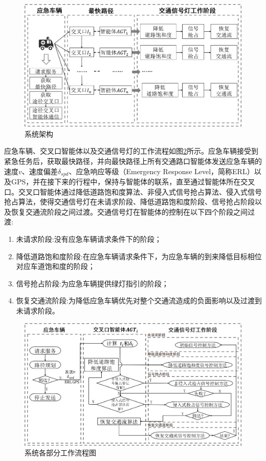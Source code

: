 \begin{figure}[ht]
	\centering
	\includegraphics[width=\textwidth]{figures/architecture.png}
	\caption{系统架构}
	\label{fig:architecture}
\end{figure}

应急车辆、交叉口智能体以及交通信号灯的工作流程如图\ref{fig:kuangjia}所示。应急车辆接受到紧急任务后，获取最快路径，并向最快路径上所有交通路口智能体发送应急车辆的速度${v}$、速度偏差${\delta_{spd}}$、应急响应等级（Emergency Response Level，简称ERL）以及GPS，并在接下来的行程中，保持与智能体的联系，直至通过智能体所在交叉口。交叉口智能体通过降低道路饱和度算法、非侵入式信号抢占算法、侵入式信号抢占算法，使得交通信号灯在未请求阶段、降低道路饱和度阶段、信号抢占阶段以及恢复交通流阶段之间过渡。交通信号灯在智能体的控制在以下四个阶段之间过渡:

\begin{enumerate}
	\item 未请求阶段:没有应急车辆请求条件下的阶段；
	\item 降低道路饱和度阶段:在应急车辆请求条件下，为应急车辆的到来降低目标相位对应车道饱和度的阶段；
	\item 信号抢占阶段:为应急车辆提供绿灯指引的阶段；
	\item 恢复交通流阶段:为降低应急车辆优先对整个交通流造成的负面影响以及过渡到未请求阶段。
\end{enumerate}

\begin{figure}[ht]
	\centering
	\includegraphics[width=\textwidth]{figures/kuangjia.png}
	\caption{系统各部分工作流程图}
	\label{fig:kuangjia}
\end{figure}



